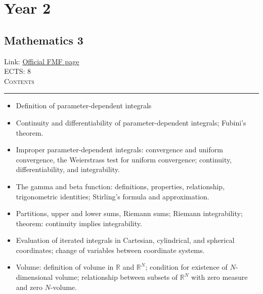 \documentclass[11pt, a4paper]{article}
\newenvironment{course}[3]{
\subsection{#1}%
Link: \href{#2}{Official FMF page}\\%
ECTS: #3%
\vspace{1ex}
\\
{\large \textsc{Contents}}\\[-0.9ex]%
\rule{\textwidth}{0.5pt}
\vspace{-3ex}
}
{}
\newenvironment{chapter}[1]{
\begin{tcolorbox}[title=#1, breakable]
}
{\end{tcolorbox}}
\begin{document}
\section{Year 2}
\begin{course}{Mathematics 3}{https://www.fmf.uni-lj.si/en/study-physics/programmes/1fiz/2020/7000777/courses/522/}{8}
    \label{mathematics-3}

    \begin{chapter}{Parameter-dependent integrals}
        \begin{itemize}
        
            \item Definition of parameter-dependent integrals

            \item Continuity and differentiability of parameter-dependent integrals; Fubini's theorem.

            \item Improper parameter-dependent integrals: convergence and uniform convergence, the Weierstrass test for uniform convergence; continuity, differentiability, and integrability.

            \item The gamma and beta function: definitions, properties, relationship, trigonometric identities; Stirling's formula and approximation.
        
        \end{itemize}
        
    \end{chapter}

    \begin{chapter}{Multi-dimensional Riemann integration}
        \begin{itemize}
        
            \item Partitions, upper and lower sums, Riemann sums; Riemann integrability; theorem: continuity implies integrability.

            \item Evaluation of iterated integrals in Cartesian, cylindrical, and spherical coordinates; change of variables between coordinate systems.

            \item Volume: definition of volume in $ \mathbb{R} $ and $ \mathbb{R}^{N} $; condition for existence of $ N $-dimensional volume; relationship between subsets of $ \mathbb{R}^{N} $ with zero measure and zero $ N $-volume.


\end{itemize}
\end{chapter}
\end{course}
\end{document}
